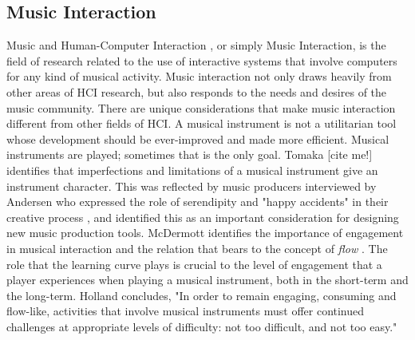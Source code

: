 \subsection{Music Interaction}
Music and Human-Computer Interaction \cite{holland2013music}, or simply Music Interaction, is the field of research related to the use of interactive systems that involve computers for any kind of musical activity. Music interaction not only draws heavily from other areas of HCI research, but also responds to the needs and desires of the music community. There are unique considerations that make music interaction different from other fields of HCI. A musical instrument is not a utilitarian tool whose development should be ever-improved and made more efficient. Musical instruments are played; sometimes that is the only goal. Tomaka [cite me!] identifies that imperfections and limitations of a musical instrument give an instrument character. This was reflected by music producers interviewed by Andersen who expressed the role of serendipity and "happy accidents" in their creative process \cite{andersen2016conversations}, and identified this as an important consideration for designing new music production tools. McDermott \cite{mcdermott2013should} identifies the importance of engagement in musical interaction and the relation that bears to the concept of \textit{flow} \cite{csikszentmihalyi1990flow}. The role that the learning curve plays is crucial to the level of engagement that a player experiences when playing a musical instrument, both in the short-term and the long-term. Holland \cite{holland2013music} concludes, "In order to remain engaging, consuming and flow-like, activities that involve musical instruments must offer continued challenges at appropriate levels of difficulty: not too difficult, and not too easy." 

